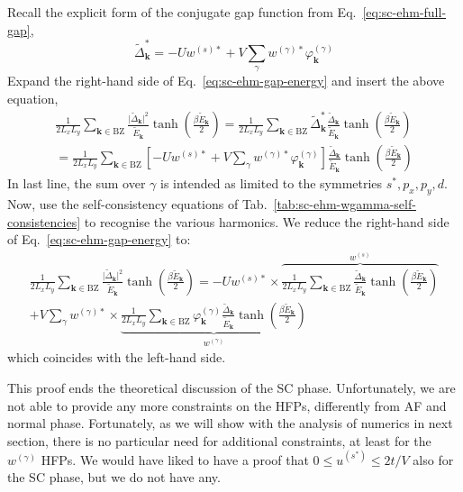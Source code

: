 \begin{tabproof}

	Recall the explicit form of the conjugate gap function from Eq.~\eqref{eq:sc-ehm-full-gap},
	\[
		\tilde{\Delta}_\mathbf{k}^* = -Uw^{(s)*} + V \sum_{\gamma} w^{(\gamma)*} \varphi_\mathbf{k}^{(\gamma)} 
	\]
	Expand the right-hand side of Eq.~\eqref{eq:sc-ehm-gap-energy} and insert the above equation,
	\begin{multline*}
		\frac{1}{2L_x L_y} \sum_{\mathbf{k} \in \mathrm{BZ}} \frac{\big|
			\tilde{\Delta}_\mathbf{k}
		\big|^2}{\tilde{E}_\mathbf{k}} \tanh(\frac{\beta\tilde{E}_\mathbf{k}}{2})
		= \frac{1}{2L_x L_y} \sum_{\mathbf{k} \in \mathrm{BZ}} \tilde{\Delta}_\mathbf{k}^*
		\frac{
			\tilde{\Delta}_\mathbf{k}
		}{\tilde{E}_\mathbf{k}} \tanh(\frac{\beta\tilde{E}_\mathbf{k}}{2}) \\
		= \frac{1}{2L_x L_y} \sum_{\mathbf{k} \in \mathrm{BZ}} \left[
			-Uw^{(s)*} + V \sum_{\gamma} w^{(\gamma)*} \varphi_\mathbf{k}^{(\gamma)} 
		\right]
		\frac{
			\tilde{\Delta}_\mathbf{k}
		}{\tilde{E}_\mathbf{k}} \tanh(\frac{\beta\tilde{E}_\mathbf{k}}{2}) 
	\end{multline*}
	In last line, the sum over $\gamma$ is intended as limited to the symmetries $s^*,p_x,p_y,d$. Now, use the self-consistency equations of Tab.~\ref{tab:sc-ehm-wgamma-self-consistencies} to recognise the various harmonics. We reduce the right-hand side of Eq.~\eqref{eq:sc-ehm-gap-energy} to:
	\begin{multline*}
		\frac{1}{2L_x L_y} \sum_{\mathbf{k} \in \mathrm{BZ}} \frac{\big|
			\tilde{\Delta}_\mathbf{k}
			\big|^2}{\tilde{E}_\mathbf{k}} \tanh(\frac{\beta\tilde{E}_\mathbf{k}}{2})= -Uw^{(s)*} \times \overbrace{
			\frac{1}{2L_x L_y} \sum_{\mathbf{k} \in \mathrm{BZ}} \frac{
				\tilde{\Delta}_\mathbf{k}
			}{\tilde{E}_\mathbf{k}} \tanh(\frac{\beta\tilde{E}_\mathbf{k}}{2})
		}^{w^{(s)}} \\
		+ V \sum_{\gamma} w^{(\gamma)*} \times \underbrace{
			\frac{1}{2L_x L_y} \sum_{\mathbf{k} \in \mathrm{BZ}} \varphi_\mathbf{k}^{(\gamma)} \frac{
			\tilde{\Delta}_\mathbf{k}
			}{\tilde{E}_\mathbf{k}} 	\tanh(\frac{\beta\tilde{E}_\mathbf{k}}{2})
		}_{w^{(\gamma)}}
	\end{multline*}
	which coincides with the left-hand side.
\end{tabproof}

This proof ends the theoretical discussion of the SC phase. Unfortunately, we are not able to provide any more constraints on the HFPs, differently from AF and normal phase. Fortunately, as we will show with the analysis of numerics in next section, there is no particular need for additional constraints, at least for the $w^{(\gamma)}$ HFPs. We would have liked to have a proof that $0 \le u^{(s^*)} \le 2t/V$ also for the SC phase, but we do not have any. 

